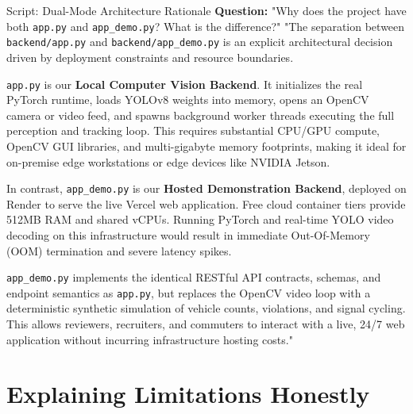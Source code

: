\documentclass[11pt,a4paper,oneside]{report}
\begin{document}
\begin{interviewq}{Script: Dual-Mode Architecture Rationale}
\textbf{Question:} "Why does the project have both \texttt{app.py} and \texttt{app\_demo.py}? What is the difference?"
\tcblower
"The separation between \texttt{backend/app.py} and \texttt{backend/app\_demo.py} is an explicit architectural decision driven by deployment constraints and resource boundaries.

\texttt{app.py} is our \textbf{Local Computer Vision Backend}. It initializes the real PyTorch runtime, loads YOLOv8 weights into memory, opens an OpenCV camera or video feed, and spawns background worker threads executing the full perception and tracking loop. This requires substantial CPU/GPU compute, OpenCV GUI libraries, and multi-gigabyte memory footprints, making it ideal for on-premise edge workstations or edge devices like NVIDIA Jetson.

In contrast, \texttt{app\_demo.py} is our \textbf{Hosted Demonstration Backend}, deployed on Render to serve the live Vercel web application. Free cloud container tiers provide 512MB RAM and shared vCPUs. Running PyTorch and real-time YOLO video decoding on this infrastructure would result in immediate Out-Of-Memory (OOM) termination and severe latency spikes.

\texttt{app\_demo.py} implements the identical RESTful API contracts, schemas, and endpoint semantics as \texttt{app.py}, but replaces the OpenCV video loop with a deterministic synthetic simulation of vehicle counts, violations, and signal cycling. This allows reviewers, recruiters, and commuters to interact with a live, 24/7 web application without incurring infrastructure hosting costs."
\end{interviewq}

\section{Explaining Limitations Honestly}
\label{sec:script_limitations_honesty}
\end{document}
